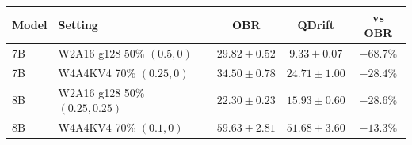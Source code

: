 \begin{tabular}{llccc}
\toprule
Model & Setting & OBR & QDrift & vs OBR \\
\midrule
7B & W2A16 g128 50\% $(0.5,0)$ & $29.82\pm0.52$ & $\mathbf{9.33\pm0.07}$ & $-68.7\%$ \\
7B & W4A4KV4 70\% $(0.25,0)$ & $34.50\pm0.78$ & $\mathbf{24.71\pm1.00}$ & $-28.4\%$ \\
8B & W2A16 g128 50\% $(0.25,0.25)$ & $22.30\pm0.23$ & $\mathbf{15.93\pm0.60}$ & $-28.6\%$ \\
8B & W4A4KV4 70\% $(0.1,0)$ & $59.63\pm2.81$ & $\mathbf{51.68\pm3.60}$ & $-13.3\%$ \\
\bottomrule
\end{tabular}
